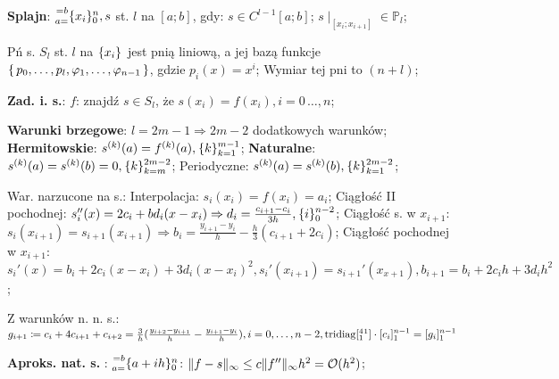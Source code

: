 
\entry
\textbf{Splajn}:
$\ipoints[0][n][a=][=b]{x_i}, s$
st. $l$ na $[a;b]$, gdy:
$s\in C^{l-1}[a;b]$;
$s\mid_{[x_i;x_{i+1}]} \in \mathbb{P}_l$;

\entry
Pń s. $S_l$ st. $l$ na $\ipoints{x_i}$ jest pnią liniową,
a jej bazą funkcje
$\set{p_0, \ldots, p_l, \varphi_1, \ldots, \varphi_{n-1}}$,
gdzie $p_i(x)=x^i$;
\entry
Wymiar tej pni to $(n+l)$;

\entry
\textbf{Zad. i. s.}:
$f$: znajdź $s\in S_l$, że
$s(x_i)=f(x_i), i=0\,\dots,n$;

\entry
\textbf{Warunki brzegowe}:
$l=2m-1 \Rightarrow 2m-2$ dodatkowych warunków;
\entry
\textbf{Hermitowskie}:
$\deriv{s}{k}(a) = \deriv{f}{k}(a), \ipoints[k=1][m-1]{k}$;
\entry
\textbf{Naturalne}:
$\deriv{s}{k}(a)=\deriv{s}{k}(b)=0, \ipoints[k=m][2m-2]{k}$;
\entry
Periodyczne:
$\deriv{s}{k}(a)=\deriv{s}{k}(b), \ipoints[k=1][2m-2]{k}$;

\entry
War. narzucone na s.:
Interpolacja:
$s_i(x_i)=f(x_i)=a_i$;
Ciągłość II pochodnej:
$s_i''(x) = 2c_i+bd_i(x-x_i) \Rightarrow d_i=\frac{c_{i+1} - c_i}{3h}, \ipoints[0][n-2]{i}$;
Ciągłość s. w $x_{i+1}$:
$s_i(x_{i+1}) = s_{i+1}(x_{i+1}) \Rightarrow b_i = \frac{y_{i+1} - y_i}{h} - \frac{h}{3}(c_{i+1} + 2c_i)$;
Ciągłość pochodnej w $x_{i+1}$:
$
s_i'(x) = b_i +2c_i(x - x_i) + 3 d_i (x - x_i)^2,
s_i'(x_{i+1}) = s_{i+1}'(x_{x+1}),
b_{i+1} = b_i + 2 c_i h + 3 d_i h^2
$;

\entry
Z warunków n. n. s.:
$
g_{i+1} \coloneqq
c_i + 4c_{i+1} + c_{i+2} =
\frac{3}{h}(\frac{y_{i+2} - y_{i+1}}{h} - \frac{y_{i+1} - y_{i}}{h}),
i=0,\ldots, n-2,
\mathrm{tridiag}[\prescript{4}{1}{}^{1}] \cdot [c_i]^{n-1}_{1} = [g_i]^{n-1}_{1}
$

\entry
\textbf{Aproks. nat. s. \mancube}:
$\ipoints[0][n][a=][=b]{a+ih}$:
$\|f-s\|_\infty \leq c\|f''\|_\infty h^2 = \mathcal{O}(h^2)$;
